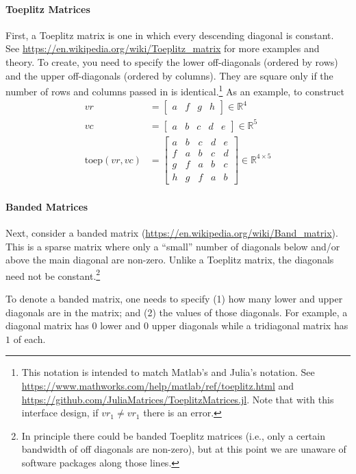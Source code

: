\documentclass[11pt]{article}
\newcommand{\R}{\ensuremath{\mathbb{R}}}
\newcommand{\toep}{\ensuremath{\mathrm{toep}}}
\theoremstyle{definition}
\begin{document}
\paragraph{Toeplitz Matrices}
First, a Toeplitz matrix is one in which every descending diagonal is constant.  See \url{https://en.wikipedia.org/wiki/Toeplitz_matrix} for more examples and theory. To create, you need to specify the lower off-diagonals (ordered by rows) and the upper off-diagonals (ordered by columns).  They are square only if the number of rows and columns passed in is identical.\footnote{This notation is intended to match Matlab's and Julia's notation.  See \url{https://www.mathworks.com/help/matlab/ref/toeplitz.html} and \url{https://github.com/JuliaMatrices/ToeplitzMatrices.jl}.  Note that with this interface design, if $vr_1 \neq vr_1$ there is an error.  }   As an example, to construct
\begin{align}
 vr &= \begin{bmatrix} a & f & g & h\end{bmatrix} \in \R^4\\
 vc &= \begin{bmatrix} a & b & c & d & e\end{bmatrix} \in \R^5\\
 \toep(vr,vc) &= \begin{bmatrix}
a & b & c & d & e \\
f & a & b & c & d \\
g & f & a & b & c \\
h & g & f & a & b
\end{bmatrix} \in \R^{4 \times 5}
 \end{align}

\paragraph{Banded Matrices}
Next, consider a banded matrix (\url{https://en.wikipedia.org/wiki/Band_matrix}).  This is a sparse matrix where only a ``small'' number of diagonals below and/or above the main diagonal are non-zero.  Unlike a Toeplitz matrix, the diagonals need not be constant.\footnote{In principle there could be banded Toeplitz matrices (i.e., only a certain bandwidth of off diagonals are non-zero), but at this point we are unaware of software packages along those lines.}

To denote a banded matrix, one needs to specify (1) how many lower and upper diagonals are in the matrix; and (2) the values of those diagonals.  For example, a diagonal matrix has $0$ lower and $0$ upper diagonals while a tridiagonal matrix has $1$ of each.
\end{document}
